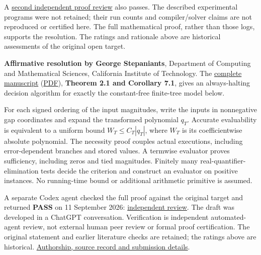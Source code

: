 \documentclass[11pt,a4paper]{article}
\makeatletter
\renewcommand{\subsection}{\Needspace{4\baselineskip}\@startsection{subsection}{2}{0pt}{9pt plus 1pt minus 1pt}{3pt}{\sffamily\bfseries\normalsize\color{ink}}}
\makeatother
\begin{document}
A
\href{https://github.com/ajt60gaibb/OpenProblemsInNLA/blob/main/references/colbrook-arithmetic-2026-09-11/verification/reviews/AA-01-second-review.md}{second
independent proof review} also passes. The described experimental
programs were not retained; their run counts and compiler/solver claims
are not reproduced or certified here. The full mathematical proof,
rather than those logs, supports the resolution. The ratings and
rationale above are historical assessments of the original open target.

\subsection{Resolution --- 2026-09-11}\label{resolution-2026-09-11}

\textbf{Affirmative resolution by George Stepaniants}, Department of
Computing and Mathematical Sciences, California Institute of Technology.
The
\href{https://github.com/ajt60gaibb/OpenProblemsInNLA/blob/main/arithmetic-and-complexity/AA-01/solution.tex}{complete
manuscript}
(\href{https://github.com/ajt60gaibb/OpenProblemsInNLA/blob/main/arithmetic-and-complexity/AA-01/solution.pdf}{PDF}),
\textbf{Theorem 2.1 and Corollary 7.1}, gives an always-halting decision
algorithm for exactly the constant-free finite-tree model below.

For each signed ordering of the input magnitudes, write the inputs in
nonnegative gap coordinates and expand the transformed polynomial
\(q_T\). Accurate evaluability is equivalent to a uniform bound
\(W_T\le C_T|q_T|\), where \(W_T\) is its coefficientwise absolute
polynomial. The necessity proof couples actual executions, including
error-dependent branches and stored values. A termwise evaluator proves
sufficiency, including zeros and tied magnitudes. Finitely many
real-quantifier-elimination tests decide the criterion and construct an
evaluator on positive instances. No running-time bound or additional
arithmetic primitive is assumed.

A separate Codex agent checked the full proof against the original
target and returned \textbf{PASS} on 11 September 2026:
\href{https://github.com/ajt60gaibb/OpenProblemsInNLA/blob/main/references/stepaniants-2026-09-11/verification/reviews/AA-01-review.md}{independent
review}. The draft was developed in a ChatGPT conversation. Verification
is independent automated-agent review, not external human peer review or
formal proof certification. The original statement and earlier
literature checks are retained; the ratings above are historical.
\href{https://github.com/ajt60gaibb/OpenProblemsInNLA/blob/main/references/stepaniants-2026-09-11/README.md}{Authorship,
source record and submission details}.
\end{document}
